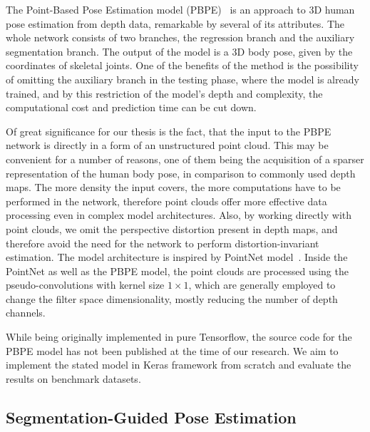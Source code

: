 The Point-Based Pose Estimation model (PBPE)~\cite{Ali19} is an approach to 3D human pose estimation from depth data, remarkable by several of its attributes. The whole network consists of two branches, the regression branch and the auxiliary segmentation branch. The output of the model is a 3D body pose, given by the coordinates of skeletal joints. One of the benefits of the method is the possibility of omitting the auxiliary branch in the testing phase, where the model is already trained, and by this restriction of the model's depth and complexity, the computational cost and prediction time can be cut down.\par
\vspace{5mm}
\noindent Of great significance for our thesis is the fact, that the input to the PBPE network is directly in a form of an unstructured point cloud. This may be convenient for a number of reasons, one of them being the acquisition of a sparser representation of the human body pose, in comparison to commonly used depth maps. The more density the input covers, the more computations have to be performed in the network, therefore point clouds offer more effective data processing even in complex model architectures. Also, by working directly with point clouds, we omit the perspective distortion present in depth maps, and therefore avoid the need for the network to perform distortion-invariant estimation. The model architecture is inspired by PointNet model~\cite{DBLP:journals/corr/QiSMG16}. Inside the PointNet as well as the PBPE model, the point clouds are processed using the pseudo-convolutions with kernel size $1 \times 1$, which are generally employed to change the filter space dimensionality, mostly reducing the number of depth channels.\par %
\vspace{5mm}
\noindent While being originally implemented in pure Tensorflow, the source code for the PBPE model has not been published at the time of our research. We aim to implement the stated model in Keras framework from scratch and evaluate the results on benchmark datasets.

\subsection{Segmentation-Guided Pose Estimation}


